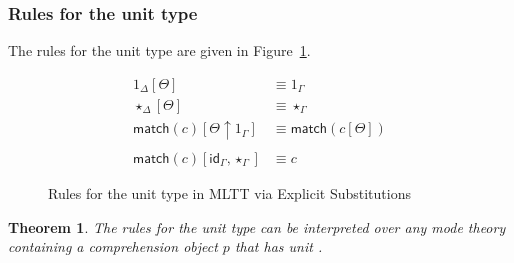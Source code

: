 \documentclass[10pt]{article}
\newtheorem{theorem}{Theorem}
\theoremstyle{definition}
\newcommand{\TYPE}{\,\,\mathsf{Type}}
\newcommand{\id}{\mathsf{id}}
\begin{document}
\subsubsection{Rules for the unit type}
\newcommand\qunitmatch[1]{\ensuremath{\mathsf{match}(#1)}}

The rules for the unit type are given in Figure~\ref{fig:qit-unit-rules}.

\begin{figure}
\begin{align}
1_\Delta[\Theta] &\equiv 1_\Gamma \\
\star_\Delta[\Theta] &\equiv \star_\Gamma \\ 
\qunitmatch{c}[\Theta \uparrow 1_\Gamma] &\equiv \qunitmatch{c[\Theta]} \\
\nonumber \\
\qunitmatch{c}[\id_\Gamma, \star_\Gamma] &\equiv c
\end{align}
\caption{Rules for the unit type in MLTT via Explicit Substitutions}\label{fig:qit-unit-rules}
\end{figure}

\begin{theorem}
The rules for the unit type can be interpreted over any mode theory containing a comprehension object $p$ that has unit .
\end{theorem}
\end{document}

